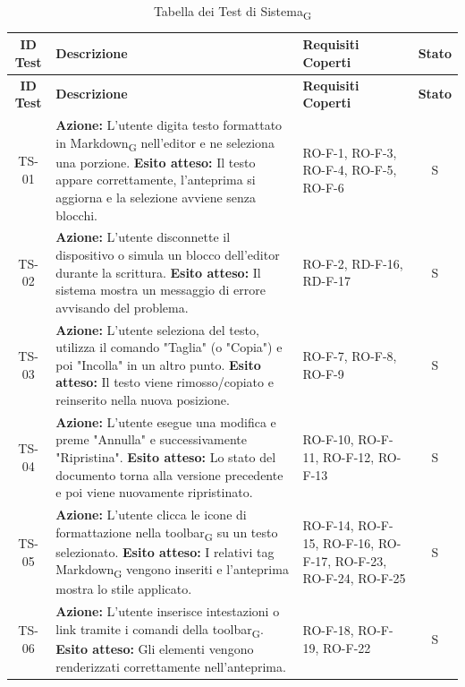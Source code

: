 \documentclass[11pt,a4paper]{article}
\newcommand{\gls}[1]{#1\textsubscript{G}}
\begin{document}
\begin{longtable}{|c|p{9cm}|p{3cm}|c|}
\hline
\textbf{ID Test} & \textbf{Descrizione} & \textbf{Requisiti Coperti} & \textbf{Stato} \\
\hline
\endfirsthead

\hline
\textbf{ID Test} & \textbf{Descrizione} & \textbf{Requisiti Coperti} & \textbf{Stato} \\
\hline
\endhead

\caption{Tabella dei \gls{Test di Sistema}} \label{tab:test_sistema} 
\endlastfoot

TS-01 & \textbf{Azione:} L'utente digita testo formattato in \gls{Markdown} nell'editor e ne seleziona una porzione. \newline \textbf{Esito atteso:} Il testo appare correttamente, l'anteprima si aggiorna e la selezione avviene senza blocchi. & RO-F-1, RO-F-3, RO-F-4, RO-F-5, RO-F-6 & S \\
\hline
TS-02 & \textbf{Azione:} L'utente disconnette il dispositivo o simula un blocco dell'editor durante la scrittura. \newline \textbf{Esito atteso:} Il sistema mostra un messaggio di errore avvisando del problema. & RO-F-2, RD-F-16, RD-F-17 & S \\
\hline
TS-03 & \textbf{Azione:} L'utente seleziona del testo, utilizza il comando "Taglia" (o "Copia") e poi "Incolla" in un altro punto. \newline \textbf{Esito atteso:} Il testo viene rimosso/copiato e reinserito nella nuova posizione. & RO-F-7, RO-F-8, RO-F-9 & S \\
\hline
TS-04 & \textbf{Azione:} L'utente esegue una modifica e preme "Annulla" e successivamente "Ripristina". \newline \textbf{Esito atteso:} Lo stato del documento torna alla versione precedente e poi viene nuovamente ripristinato. & RO-F-10, RO-F-11, RO-F-12, RO-F-13 & S \\
\hline
TS-05 & \textbf{Azione:} L'utente clicca le icone di formattazione nella \gls{toolbar} su un testo selezionato. \newline \textbf{Esito atteso:} I relativi tag \gls{Markdown} vengono inseriti e l'anteprima mostra lo stile applicato. & RO-F-14, RO-F-15, RO-F-16, RO-F-17, RO-F-23, RO-F-24, RO-F-25 & S \\
\hline
TS-06 & \textbf{Azione:} L'utente inserisce intestazioni o link tramite i comandi della \gls{toolbar}. \newline \textbf{Esito atteso:} Gli elementi vengono renderizzati correttamente nell'anteprima. & RO-F-18, RO-F-19, RO-F-22 & S \\

\end{longtable}
\end{document}
